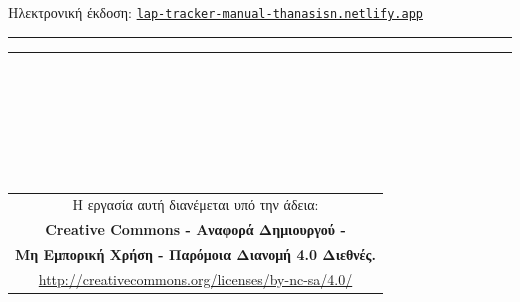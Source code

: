 \documentclass[
  a4paper,
  twoside,
  titlepage,
  12pt]{article}
\numberwithin{equation}{section}
\numberwithin{figure}{section}
\numberwithin{table}{section}
\begin{document}
\begin{titlepage}

    \vfill


    {\small{Ηλεκτρονική έκδοση:} \large\texttt{\href{https://lap-tracker-manual-thanasisn.netlify.app}{lap-tracker-manual-thanasisn.netlify.app}}}\\

    \rule{\textwidth}{0.4pt}\par %
    \vspace{2pt}\vspace{-\baselineskip} %
    \rule{\textwidth}{1pt}\par %
\end{titlepage}
\newpage

%

{
\hypersetup{linkcolor=}
\setcounter{tocdepth}{3}
\tableofcontents
}
\listoffigures
\listoftables
\newpage

\hypertarget{section}{%
\section*{}\label{section}}

~

~
\vfill
~

~

\begin{longtable}[]{@{}c@{}}
\toprule()
\endhead
Η εργασία αυτή διανέμεται υπό την άδεια: \\
\textbf{Creative Commons - Αναφορά Δημιουργού -} \\
\textbf{Μη Εμπορική Χρήση - Παρόμοια Διανομή 4.0 Διεθνές.} \\
\url{http://creativecommons.org/licenses/by-nc-sa/4.0/} \\
\bottomrule()
\end{longtable}
\end{document}
